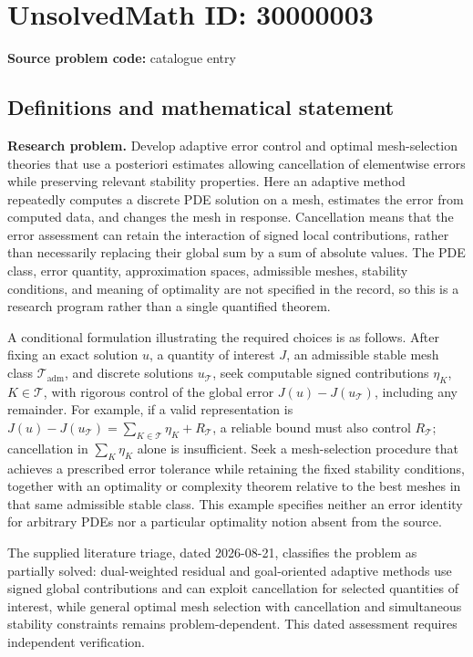 \documentclass[11pt]{article}
\begin{document}
\section*{UnsolvedMath ID: 30000003}
\textbf{Source problem code:} catalogue entry
\subsection{Definitions and mathematical statement}
\textbf{Research problem.} Develop adaptive error control and optimal mesh-selection theories that use a posteriori estimates allowing cancellation of elementwise errors while preserving relevant stability properties. Here an adaptive method repeatedly computes a discrete PDE solution on a mesh, estimates the error from computed data, and changes the mesh in response. Cancellation means that the error assessment can retain the interaction of signed local contributions, rather than necessarily replacing their global sum by a sum of absolute values. The PDE class, error quantity, approximation spaces, admissible meshes, stability conditions, and meaning of optimality are not specified in the record, so this is a research program rather than a single quantified theorem.\par A conditional formulation illustrating the required choices is as follows. After fixing an exact solution \(u\), a quantity of interest \(J\), an admissible stable mesh class \(\mathcal T_{\mathrm{adm}}\), and discrete solutions \(u_{\mathcal T}\), seek computable signed contributions \(\eta_K\), \(K\in\mathcal T\), with rigorous control of the global error \(J(u)-J(u_{\mathcal T})\), including any remainder. For example, if a valid representation is \(J(u)-J(u_{\mathcal T})=\sum_{K\in\mathcal T}\eta_K+R_{\mathcal T}\), a reliable bound must also control \(R_{\mathcal T}\); cancellation in \(\sum_K\eta_K\) alone is insufficient. Seek a mesh-selection procedure that achieves a prescribed error tolerance while retaining the fixed stability conditions, together with an optimality or complexity theorem relative to the best meshes in that same admissible stable class. This example specifies neither an error identity for arbitrary PDEs nor a particular optimality notion absent from the source.\par The supplied literature triage, dated 2026-08-21, classifies the problem as partially solved: dual-weighted residual and goal-oriented adaptive methods use signed global contributions and can exploit cancellation for selected quantities of interest, while general optimal mesh selection with cancellation and simultaneous stability constraints remains problem-dependent. This dated assessment requires independent verification.
\end{document}
